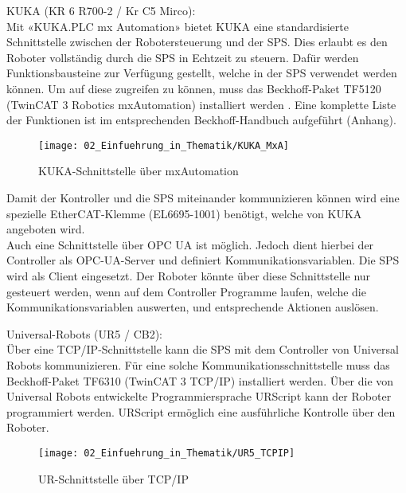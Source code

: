		KUKA (KR 6 R700-2 / Kr C5 Mirco):
		\vspace{2mm}
		\\
		Mit «KUKA.PLC mx Automation» bietet KUKA eine standardisierte Schnittstelle zwischen der Robotersteuerung und der SPS. Dies erlaubt es den Roboter vollständig durch die SPS in Echtzeit zu steuern. Dafür werden Funktionsbausteine zur Verfügung gestellt, welche in der SPS verwendet werden können. Um auf diese zugreifen zu können, muss das Beckhoff-Paket TF5120 (TwinCAT 3 Robotics mxAutomation) installiert werden . Eine komplette Liste der Funktionen ist im entsprechenden Beckhoff-Handbuch aufgeführt (Anhang).
		
		\newpage
		
		\begin{figure}[h!]
			\centering
			\texttt{[image: 02\_Einfuehrung\_in\_Thematik/KUKA\_MxA]}
			\captionsetup{justification=centering}
			\caption{KUKA-Schnittstelle über mxAutomation}
			\label{fig:KUKA_mxA}
		\end{figure}
		
		Damit der Kontroller und die SPS miteinander kommunizieren können wird eine spezielle EtherCAT-Klemme (EL6695-1001) benötigt, welche von KUKA angeboten wird. 
		\\
		Auch eine Schnittstelle über OPC UA ist möglich. Jedoch dient hierbei der Controller als OPC-UA-Server und definiert Kommunikationsvariablen. Die SPS wird als Client eingesetzt. Der Roboter könnte über diese Schnittstelle nur gesteuert werden, wenn auf dem Controller Programme laufen, welche die Kommunikationsvariablen auswerten, und entsprechende Aktionen auslösen. 
		\vspace{3mm}
		
		Universal-Robots (UR5 / CB2):
		\vspace{2mm}
		\\
		Über eine TCP/IP-Schnittstelle kann die SPS mit dem Controller von Universal Robots kommunizieren. Für eine solche Kommunikationsschnittstelle muss das Beckhoff-Paket TF6310 (TwinCAT 3 TCP/IP) installiert werden. Über die von Universal Robots entwickelte Programmiersprache URScript kann der Roboter programmiert werden. URScript ermöglich eine ausführliche Kontrolle über den Roboter.
		
		\begin{figure}[h!]
			\centering
			\texttt{[image: 02\_Einfuehrung\_in\_Thematik/UR5\_TCPIP]}
			\captionsetup{justification=centering}
			\caption{UR-Schnittstelle über TCP/IP}
			\label{fig:UR_TCPIP}
		\end{figure}
	
